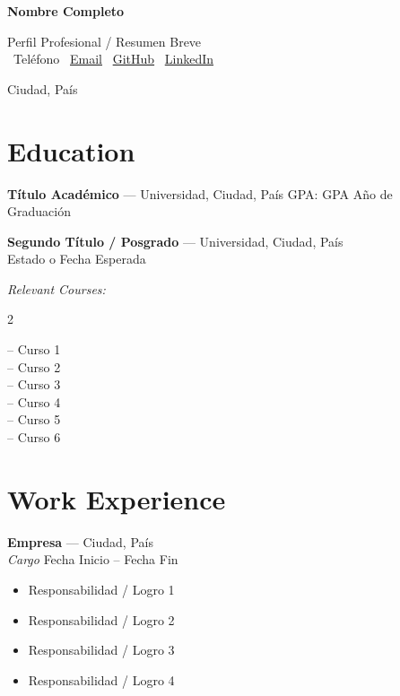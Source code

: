 \documentclass[10pt,a4paper]{article}
\begin{document}
\begin{center}
    {\LARGE \textbf{{Nombre Completo}}} \\[6pt]
\end{center}

{Perfil Profesional / Resumen Breve} \\[-1pt]

\faPhone\ {Teléfono} \quad
\faEnvelope\ \href{mailto:{Email}}{{Email}} \quad
\faGithub\ \href{{URL GitHub}}{{GitHub}} \quad
\faLinkedin\ \href{{URL LinkedIn}}{{LinkedIn}}

\begin{center}
    {Ciudad, País}
\end{center}

\section*{Education}

\textbf{{Título Académico}} — {Universidad}, {Ciudad}, {País} GPA: {GPA} \hfill {Año de Graduación}

\textbf{{Segundo Título / Posgrado}} — {Universidad}, {Ciudad}, {País} \\
{Estado o Fecha Esperada}

\textit{Relevant Courses:}
\setlength{\multicolsep}{2pt}
\begin{multicols}{2}
\raggedright
-- {Curso 1}\\
-- {Curso 2}\\
-- {Curso 3}\\
-- {Curso 4}\\
-- {Curso 5}\\
-- {Curso 6}
\end{multicols}
\vspace{-10pt}

\section*{Work Experience}

\textbf{{Empresa}} — {Ciudad}, {País} \\
\textit{{Cargo}} \hfill {Fecha Inicio -- Fecha Fin}
\begin{itemize}
    \item {Responsabilidad / Logro 1}
    \item {Responsabilidad / Logro 2}
    \item {Responsabilidad / Logro 3}
    \item {Responsabilidad / Logro 4}
\end{itemize}
\end{document}
